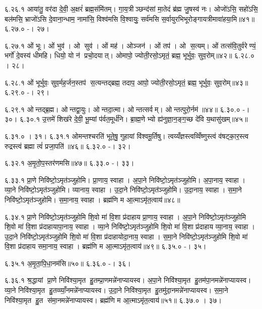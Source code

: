 ६.२६.१
आया॑तु॒ वर॑दा दे॒वी॒ अ॒क्षरं॑ ब्रह्म॒संमि॑तम्। गा॒य॒त्रीञ्छन्द॑सां मा॒तेदं ब्र॑ह्म जु॒षस्व॑ नः। ओजो॑ऽसि॒ सहो॑ऽसि॒ बल॑मसि॒ भ्राजो॑ऽसि दे॒वाना॒न्धाम॒ नामा॑सि॒ विश्व॑मसि वि॒श्वायुः॒ सर्व॑मसि स॒र्वायुरभिभूरोङ्गायत्रीमावा॑हया॒मि॥४१॥
६.२७.०
-। २७।
\anuvakamend

६.२७.१
ओं भूः। ओं भुव॑। ओ सुव॑। ओं मह॑। ओञ्जन॑। ओं तप॑। ओ स॒त्यम्। ओं तत्स॑वि॒तुर्वरेण्यं॒ भर्गो॑ दे॒वस्य॑ धीमहि। धियो॒ यो न॑ प्रचो॒दयात्। ओमापो॒ ज्योती॒रसो॒ऽमृतं॒ ब्रह्म॒ भूर्भुवः॒ सुव॒रोम्॥४२॥
६.२८.०
। २८।
\anuvakamend

६.२८.१
ओं भूर्भुवः॒ सुव॒र्मह॒र्जन॒स्तप॑ स॒त्यन्तद्ब्रह्म॒ तदाप॒ आपो॒ ज्योती॒रसो॒ऽमृतं॒ ब्रह्म॒ भूर्भुवः॒ सुव॒रोम्॥४३॥
६.२९.०
-। २९।
\anuvakamend

६.२९.१
ओन्तद्ब्र॒ह्म। ओन्तद्वा॒युः। ओन्तदा॒त्मा। ओन्तत्सर्वम्। ओन्तत्पुरो॒र्नम॑॥४४॥
६.३०.०
-। ३०।
६.३०.१
उ॒त्तमे॑ शिख॑रे दे॒वी॒ भू॒म्यां प॑र्वत॒मूर्ध॑नि। ब्रा॒ह्म॒णेभ्यो ह्य॑नुज्ञा॒न॒ङ्ग॒च्छ दे॑वि य॒थासु॑खम्॥४५॥
\anuvakamend

६.३१.०
। ३१।
६.३१.१
ओमन्तश्चरति॑ भूते॒षु॒ गुहायां वि॑श्वमू॒र्तिषु। त्वय्यँज्ञस्त्वव्विँष्णुस्त्वं व॑षट्का॒र॒स्त्व रुद्रस्त्वं ब्रह्मा त्वं॑ प्रजा॒पति॑॥४६॥
६.३२.०
-। ३२।
\anuvakamend

६.३२.१
अ॒मृ॒तो॒प॒स्तर॑णमसि॥४७॥
६.३३.०
-। ३३।
\anuvakamend

६.३३.१
प्रा॒णे निवि॑ष्टो॒ऽमृत॑ञ्जुहोमि। प्रा॒णाय॒ स्वाहा। अ॒पा॒ने निवि॑ष्टो॒ऽमृत॑ञ्जुहोमि। अ॒पा॒नाय॒ स्वाहा। व्या॒ने निवि॑ष्टो॒ऽमृत॑ञ्जुहोमि। व्यानाय॒ स्वाहा। उ॒दा॒ने निवि॑ष्टो॒ऽमृत॑ञ्जुहोमि। उ॒दा॒नाय॒ स्वाहा। स॒मा॒ने निवि॑ष्टो॒ऽमृत॑ञ्जुहोमि। स॒मा॒नाय॒ स्वाहा। ब्रह्म॑णि म आ॒त्माऽमृ॑त॒त्वाय॑॥४८॥
\anuvakamend

६.३४.१
प्रा॒णे निवि॑ष्टो॒ऽमृत॑ञ्जुहोमि शि॒वो मा॑ वि॒शा प्र॑दाहाय प्रा॒णाय॒ स्वाहा। अ॒पा॒ने निवि॑ष्टो॒ऽमृत॑ञ्जुहोमि शि॒वो मा॑ वि॒शा प्र॑दाहायापा॒नाय॒ स्वाहा। व्या॒ने निवि॑ष्टो॒ऽमृत॑ञ्जुहोमि शि॒वो मा॑ वि॒शा प्र॑दाहाय व्या॒नाय॒ स्वाहा। उ॒दा॒ने निवि॑ष्टो॒ऽमृत॑ञ्जुहोमि शि॒वो मा॑ वि॒शा प्र॑दाहायोदा॒नाय॒ स्वाहा। स॒मा॒ने निवि॑ष्टो॒ऽमृत॑ञ्जुहोमि शि॒वो मा॑ वि॒शा प्र॑दाहाय समा॒नाय॒ स्वाहा। ब्रह्म॑णि म आ॒त्माऽमृ॑त॒त्वाय॑॥४९॥
६.३५.०
-। ३५।
\anuvakamend

६.३५.१
अ॒मृ॒ता॒पि॒धा॒नम॑सि॥५०॥
६.३६.०
-। ३६।
\anuvakamend

६.३६.१
श्र॒द्धायां प्रा॒णे निवि॑श्या॒मृत हु॒तम्प्रा॒णमन्ने॑नाप्यायस्व। अ॒पा॒ने निवि॑श्या॒मृत हु॒तम॑पा॒नमन्ने॑नाप्यायस्व। व्या॒ने निवि॑श्या॒मृत हु॒तव्व्याँ॒नमन्ने॑नाप्यायस्व। उ॒दा॒ने निवि॑श्या॒मृत हु॒तमु॑दा॒नमन्ने॑नाप्यायस्व। स॒मा॒ने निवि॑श्या॒मृत हु॒त स॑मा॒नमन्ने॑नाप्यायस्व। ब्रह्म॑णि म आ॒त्माऽमृ॑त॒त्वाय॑॥५१॥
६.३७.०
। ३७।
\anuvakamend


